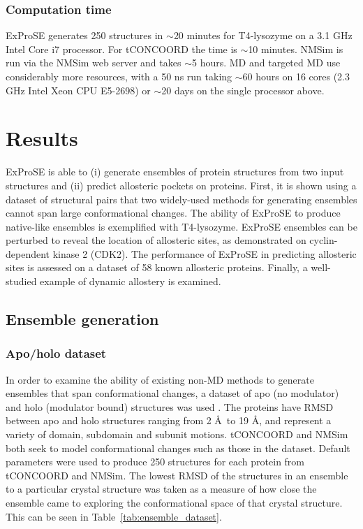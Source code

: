 \subsubsection{Computation time}

ExProSE generates 250 structures in $\sim$20 minutes for T4-lysozyme on a 3.1 GHz Intel Core i7 processor.
For tCONCOORD the time is $\sim$10 minutes.
NMSim is run via the NMSim web server and takes $\sim$5 hours.
MD and targeted MD use considerably more resources, with a 50 ns run taking $\sim$60 hours on 16 cores (2.3 GHz Intel Xeon CPU E5-2698) or $\sim$20 days on the single processor above.


\section{Results}

ExProSE is able to (i) generate ensembles of protein structures from two input structures and (ii) predict allosteric pockets on proteins.
First, it is shown using a dataset of structural pairs that two widely-used methods for generating ensembles cannot span large conformational changes.
The ability of ExProSE to produce native-like ensembles is exemplified with T4-lysozyme.
ExProSE ensembles can be perturbed to reveal the location of allosteric sites, as demonstrated on cyclin-dependent kinase 2 (CDK2).
The performance of ExProSE in predicting allosteric sites is assessed on a dataset of 58 known allosteric proteins.
Finally, a well-studied example of dynamic allostery is examined.


\subsection{Ensemble generation}

\subsubsection{Apo/holo dataset}

In order to examine the ability of existing non-MD methods to generate ensembles that span conformational changes, a dataset of apo (no modulator) and holo (modulator bound) structures was used \cite{Atilgan2010}.
The proteins have RMSD between apo and holo structures ranging from 2 \AA\ to 19 \AA, and represent a variety of domain, subdomain and subunit motions.
tCONCOORD \cite{Seeliger2007} and NMSim \cite{Kruger2012} both seek to model conformational changes such as those in the dataset.
Default parameters were used to produce 250 structures for each protein from tCONCOORD and NMSim.
The lowest RMSD of the structures in an ensemble to a particular crystal structure was taken as a measure of how close the ensemble came to exploring the conformational space of that crystal structure.
This can be seen in Table~\ref{tab:ensemble_dataset}.

